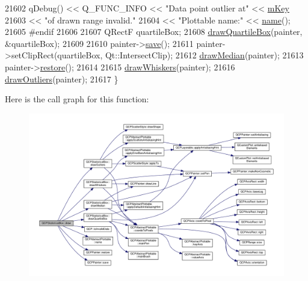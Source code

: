 \begin{DoxyCode}
21602       qDebug() << Q\_FUNC\_INFO << \textcolor{stringliteral}{"Data point outlier at"} << \hyperlink{class_q_c_p_statistical_box_a86fd1d3be5c5bc11d11eda7517069af4}{mKey}
21603                << \textcolor{stringliteral}{"of drawn range invalid."}
21604                << \textcolor{stringliteral}{"Plottable name:"} << \hyperlink{class_q_c_p_abstract_plottable_a1affc1972938e4364a9325e4e4e4dcea}{name}();
21605 \textcolor{preprocessor}{#endif}
21606 
21607   QRectF quartileBox;
21608   \hyperlink{class_q_c_p_statistical_box_a9ad0abdb154fefb04e9872f0db8e2ec7}{drawQuartileBox}(painter, &quartileBox);
21609 
21610   painter->\hyperlink{class_q_c_p_painter_a8fd6821ee6fecbfa04444c9062912abd}{save}();
21611   painter->setClipRect(quartileBox, Qt::IntersectClip);
21612   \hyperlink{class_q_c_p_statistical_box_a16fef8bc19e5a09d82033edcfe919495}{drawMedian}(painter);
21613   painter->\hyperlink{class_q_c_p_painter_a64908e6298d5bbd83457dc987cc3a022}{restore}();
21614 
21615   \hyperlink{class_q_c_p_statistical_box_a6f8d093ec7e404529388d02da4c72b34}{drawWhiskers}(painter);
21616   \hyperlink{class_q_c_p_statistical_box_a60ebb332a497f51ace837767db5105b9}{drawOutliers}(painter);
21617 \}
\end{DoxyCode}


Here is the call graph for this function\+:\nopagebreak
\begin{figure}[H]
\begin{center}
\leavevmode
\includegraphics[width=350pt]{class_q_c_p_statistical_box_a753b62761217dd6b92f8a29e286a1317_cgraph}
\end{center}
\end{figure}


\hypertarget{class_q_c_p_statistical_box_a51764ed423fa02d3ef63f6848851ec33}{}
